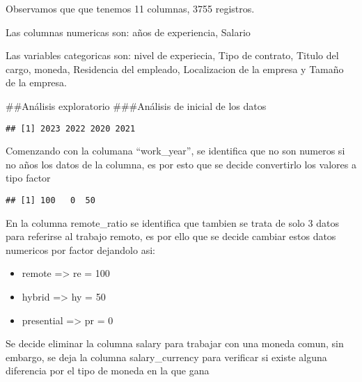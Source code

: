 \documentclass[
]{article}
\providecommand{\tightlist}{%
  \setlength{\itemsep}{0pt}\setlength{\parskip}{0pt}}
\begin{document}
Observamos que que tenemos 11 columnas, 3755 registros.

Las columnas numericas son: años de experiencia, Salario

Las variables categoricas son: nivel de experiecia, Tipo de contrato,
Titulo del cargo, moneda, Residencia del empleado, Localizacion de la
empresa y Tamaño de la empresa.

\#\#Análisis exploratorio \#\#\#Análisis de inicial de los datos

\begin{verbatim}
## [1] 2023 2022 2020 2021
\end{verbatim}

Comenzando con la columana ``work\_year'', se identifica que no son
numeros si no años los datos de la columna, es por esto que se decide
convertirlo los valores a tipo factor

\begin{verbatim}
## [1] 100   0  50
\end{verbatim}

En la columna remote\_ratio se identifica que tambien se trata de solo 3
datos para referirse al trabajo remoto, es por ello que se decide
cambiar estos datos numericos por factor dejandolo asi:

\begin{itemize}
\tightlist
\item
  remote =\textgreater{} re = 100
\item
  hybrid =\textgreater{} hy = 50
\item
  presential =\textgreater{} pr = 0
\end{itemize}

Se decide eliminar la columna salary para trabajar con una moneda comun,
sin embargo, se deja la columna salary\_currency para verificar si
existe alguna diferencia por el tipo de moneda en la que gana
\end{document}
